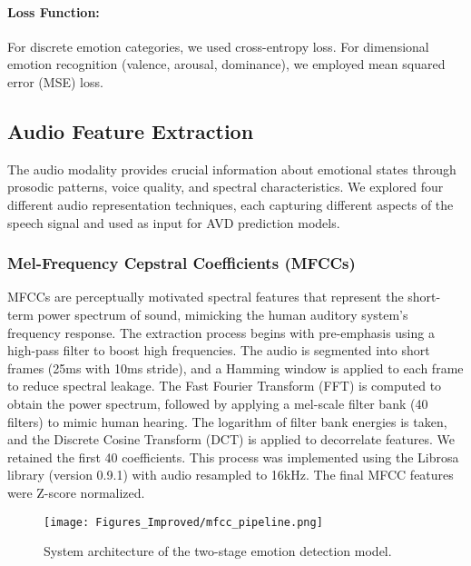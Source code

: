\documentclass[12pt]{article}
\begin{document}
\paragraph{Loss Function:}
For discrete emotion categories, we used cross-entropy loss. For dimensional emotion recognition (valence, arousal, dominance), we employed mean squared error (MSE) loss.

\subsection{Audio Feature Extraction}
The audio modality provides crucial information about emotional states through prosodic patterns, voice quality, and spectral characteristics. We explored four different audio representation techniques, each capturing different aspects of the speech signal and used as input for AVD prediction models.

\subsubsection{Mel-Frequency Cepstral Coefficients (MFCCs)}
MFCCs are perceptually motivated spectral features that represent the short-term power spectrum of sound, mimicking the human auditory system's frequency response. The extraction process begins with pre-emphasis using a high-pass filter to boost high frequencies. The audio is segmented into short frames (25ms with 10ms stride), and a Hamming window is applied to each frame to reduce spectral leakage. The Fast Fourier Transform (FFT) is computed to obtain the power spectrum, followed by applying a mel-scale filter bank (40 filters) to mimic human hearing. The logarithm of filter bank energies is taken, and the Discrete Cosine Transform (DCT) is applied to decorrelate features. We retained the first 40 coefficients. This process was implemented using the Librosa library (version 0.9.1) with audio resampled to 16kHz. The final MFCC features were Z-score normalized.

\begin{figure}[h]
    \centering
    \texttt{[image: Figures\_Improved/mfcc\_pipeline.png]}
    \caption{System architecture of the two-stage emotion detection model.}
    \label{fig:mfcc_pipeline}
\end{figure}
\end{document}
